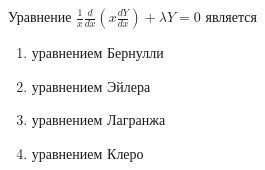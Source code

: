 Уравнение \(\frac{1}{x}\frac{d}{dx}\left(x\frac{dY}{dx}\right)+\lambda Y=0\) является

\begin{enumerate}[label=\arabic*)]
    \item уравнением Бернулли
    \item уравнением Эйлера
    \item уравнением Лагранжа
    \item уравнением Клеро
\end{enumerate}

